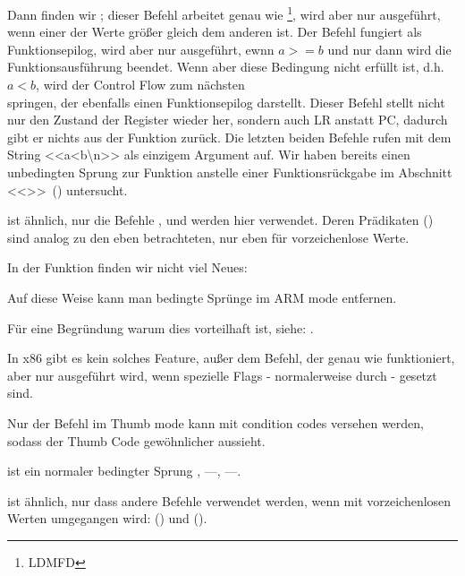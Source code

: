 Dann finden wir ; dieser Befehl arbeitet genau wie \footnote{\ac{LDMFD}}, wird aber nur
ausgeführt, wenn einer der Werte größer gleich dem anderen ist. 
Der Befehl  fungiert als Funktionsepilog, wird aber nur ausgeführt, ewnn $a>=b$ und nur
dann wird die Funktionsausführung beendet.
Wenn aber diese Bedingung nicht erfüllt ist, d.h. $a<b$, wird der Control Flow zum nächsten \\
 springen, der ebenfalls einen Funktionsepilog darstellt. Dieser Befehl stellt nicht nur
den Zustand der  Register wieder her, sondern auch \ac{LR} anstatt \ac{PC}, dadurch gibt er nichts aus der
Funktion zurück.
Die letzten beiden Befehle rufen \printf mit dem String <<a<b\textbackslash{}n>> als einzigem Argument auf.
Wir haben bereits einen unbedingten Sprung zur Funktion \printf anstelle einer Funktionsrückgabe im Abschnitt
<<\PrintfSeveralArgumentsSectionName>>~() untersucht.

 ist ähnlich, nur die Befehle ,  und  werden hier verwendet.
Deren Prädikaten () sind analog zu den eben
betrachteten, nur eben für vorzeichenlose Werte. 

In der Funktion \main finden wir nicht viel Neues:


Auf diese Weise kann man bedingte Sprünge im ARM mode entfernen.


Für eine Begründung warum dies vorteilhaft ist, siehe: .

In x86 gibt es kein solches Feature, außer dem  Befehl, der genau wie \MOV funktioniert, aber nur ausgeführt
wird, wenn spezielle Flags - normalerweise durch \CMP - gesetzt sind.


\mysubparagraph{\OptimizingKeilVI (\ThumbMode)}



Nur der  Befehl im Thumb mode kann mit condition codes versehen werden, sodass der Thumb Code gewöhnlicher
aussieht.


 ist ein normaler bedingter Sprung , 
---, 
---.

 ist ähnlich, nur dass andere Befehle verwendet werden, wenn mit vorzeichenlosen Werten umgegangen wird:
 () und  ().
